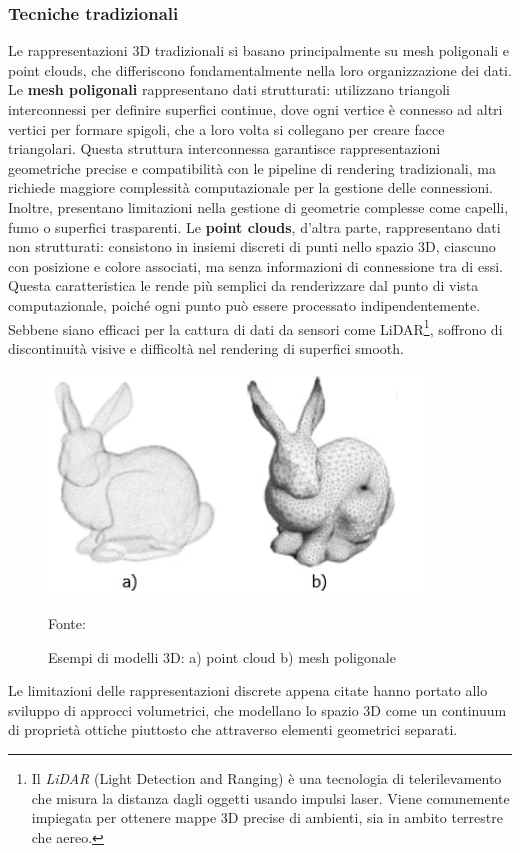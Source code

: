 \subsubsection{Tecniche tradizionali}
Le rappresentazioni 3D tradizionali si basano principalmente su mesh poligonali e point clouds, che differiscono fondamentalmente nella loro organizzazione dei dati.
\newline\newline
Le \textbf{mesh poligonali} rappresentano dati strutturati: utilizzano triangoli interconnessi per definire superfici continue, dove ogni vertice è connesso ad altri vertici per formare spigoli, che a loro volta si collegano per creare facce triangolari. Questa struttura interconnessa garantisce rappresentazioni geometriche precise e compatibilità con le pipeline di rendering tradizionali, ma richiede maggiore complessità computazionale per la gestione delle connessioni. Inoltre, presentano limitazioni nella gestione di geometrie complesse come capelli, fumo o superfici trasparenti.
\newline\newline
Le \textbf{point clouds}, d'altra parte, rappresentano dati non strutturati: consistono in insiemi discreti di punti nello spazio 3D, ciascuno con posizione e colore associati, ma senza informazioni di connessione tra di essi. Questa caratteristica le rende più semplici da renderizzare dal punto di vista computazionale, poiché ogni punto può essere processato indipendentemente. Sebbene siano efficaci per la cattura di dati da sensori come LiDAR\footnote{Il \textit{LiDAR} (Light Detection and Ranging) è una tecnologia di telerilevamento che misura la distanza dagli oggetti usando impulsi laser. Viene comunemente impiegata per ottenere mappe 3D precise di ambienti, sia in ambito terrestre che aereo.}, soffrono di discontinuità visive e difficoltà nel rendering di superfici smooth.
\begin{figure}[htbp]
    \centering
    \includegraphics[width=0.9\textwidth]{images/rabbits.jpg}
    \caption{Esempi di modelli 3D: a) point cloud b) mesh poligonale}
    Fonte: \cite{researchgate_bunny}
\end{figure}
Le limitazioni delle rappresentazioni discrete appena citate hanno portato allo sviluppo di approcci volumetrici, che modellano lo spazio 3D come un continuum di proprietà ottiche piuttosto che attraverso elementi geometrici separati.

